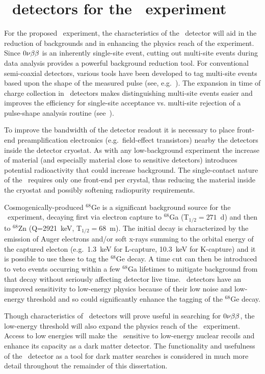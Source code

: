 	\section{\ppc~detectors for the \MJ~experiment}

For the proposed \MJ~experiment, the characteristics of the \ppc~detector
will aid in the reduction of backgrounds and in enhancing the physics reach of
the experiment.  Since $0 \nu \beta \beta$ is an inherently single-site event, cutting out
multi-site events during data analysis provides a powerful background reduction
tool.  For conventional semi-coaxial detectors, various tools have been developed
to tag multi-site events based upon the shape of the measured pulse (see,
e.g.~\cite{Aal00}).  The expansion in time
of charge collection in \ppc~detectors makes distinguishing multi-site events easier and improves the efficiency for single-site acceptance vs. multi-site rejection of a pulse-shape analysis routine (see~\cite{Budjas:2009zu,Ren10}).

To improve the bandwidth of the detector readout it is necessary to
place front-end preamplification electronics (e.g.~field-effect transistors) nearby the detectors
inside the detector cryostat.  As with any low-background 
experiment the increase of material (and especially material close to
sensitive detectors) introduces potential radioactivity that could
increase background.  The single-contact nature of the \ppc~requires only one
front-end per crystal, thus reducing the material inside the cryostat and possibly
softening radiopurity requirements.

Cosmogenically-produced $^{68}$Ge is a significant background
source for the \MJ~experiment, decaying first via electron capture to $^{68}$Ga
(T$_{1/2}=271$~d) and then to $^{68}$Zn (Q=2921~keV, T$_{1/2}=68$~m).  The
initial decay is characterized by the emission of Auger electrons and/or soft x-rays
summing to the orbital energy of the captured electon (e.g.~1.3~keV for L-capture, 10.3~keV for K-capture) 
and it is possible to use these to tag the $^{68}$Ge decay.  A time cut can then be introduced to veto events
occurring within a few $^{68}$Ga lifetimes to mitigate background from that
decay without seriously affecting detector live time.   \ppc~detectors have an
improved sensitivity to low-energy physics because of their low noise and 
low-energy threshold and so could significantly enhance the tagging of the
$^{68}$Ge decay.  

Though characteristics of \ppc~detectors will prove useful in searching for
$0 \nu \beta \beta$, the low-energy threshold will also
expand the physics reach of the \MJ~experiment.  Access to low energies will 
make the \minmod~sensitive to low-energy nuclear recoils and enhance its capacity as a dark matter
detector.  The functionality and usefulness of the \ppc~detector as a tool for dark
matter searches is considered in much more detail 
throughout the remainder of this dissertation.


